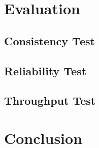 \documentclass[11pt]{article}
\begin{document}
\section{Evaluation}
\label{sec:eval}
\subsection{Consistency Test}
\subsection{Reliability Test}
\subsection{Throughput Test}

\section{Conclusion}
\label{sec:conclusion}

\appendix
\end{document}
